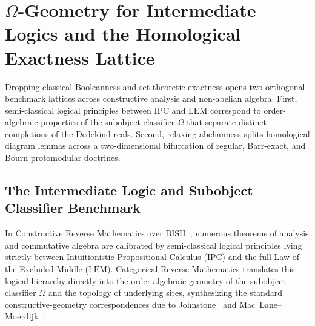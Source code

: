 \documentclass[10pt,twoside,openright]{book}
\theoremstyle{crmplain}
\theoremstyle{crmdef}
\theoremstyle{crmremark}
\begin{document}
\section{\texorpdfstring{$\Omega$-Geometry for Intermediate Logics and the Homological Exactness Lattice}{Omega-Geometry for Intermediate Logics and the Homological Exactness Lattice}}\label{sec:panorama-omega-homological}

Dropping classical Booleanness and set-theoretic exactness opens two orthogonal benchmark lattices across constructive analysis and non-abelian algebra. First, semi-classical logical principles between $\mathrm{IPC}$ and $\mathrm{LEM}$ correspond to order-algebraic properties of the subobject classifier $\Omega$ that separate distinct completions of the Dedekind reals. Second, relaxing abelianness splits homological diagram lemmas across a two-dimensional bifurcation of regular, Barr-exact, and Bourn protomodular doctrines.

\subsection{The Intermediate Logic and Subobject Classifier Benchmark}

In Constructive Reverse Mathematics over $\mathrm{BISH}$~\cite{Bishop67,Ishihara06}, numerous theorems of analysis and commutative algebra are calibrated by semi-classical logical principles lying strictly between Intuitionistic Propositional Calculus ($\mathrm{IPC}$) and the full Law of the Excluded Middle ($\mathrm{LEM}$). Categorical Reverse Mathematics translates this logical hierarchy directly into the order-algebraic geometry of the subobject classifier $\Omega$ and the topology of underlying sites, synthesizing the standard constructive-geometry correspondences due to Johnstone~\cite{Johnstone82,Johnstone02} and Mac~Lane--Moerdijk~\cite{MacLaneMoerdijk92}:
\end{document}
